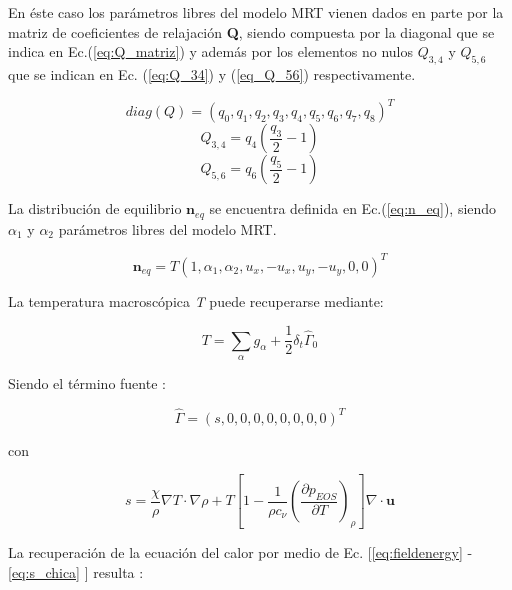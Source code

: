 En éste caso los parámetros libres del modelo MRT vienen dados en parte por la matriz de coeficientes de relajación \textbf{Q}, siendo compuesta por la diagonal que se indica en Ec.(\ref{eq:Q_matriz}) y además por los elementos no nulos $Q_{3,4}$ y $ Q_{5,6}$ que se indican en Ec. (\ref{eq:Q_34}) y (\ref{eq_Q_56})  respectivamente.

\begin{equation}
    \textit{diag} (Q) = {( q_{0} , q_{1} , q_{2} , q_{3} , q_{4} , q_{5} , q_{6} , q_{7} , q_{8} )}^{T}
    \label{eq:Q_matriz}
\end{equation}
\begin{equation}
    Q_{3,4} = q_{4} \left( \frac{q_{3}}{2} - 1 \right)
    \label{eq:Q_34}
\end{equation}
\begin{equation}
    Q_{5,6} = q_{6} \left( \frac{q_{5}}{2} - 1 \right)
    \label{eq_Q_56}
\end{equation}

La distribución de equilibrio $\mathbf{n}_{eq}$ se encuentra definida en Ec.(\ref{eq:n_eq}), siendo $\alpha_{1}$ y $\alpha_{2}$ parámetros libres del modelo MRT.

\begin{equation}
    {\mathbf{n}}_{eq} = T { \left( 1, \alpha_{1}, \alpha_{2}, u_{x}, -u_{x}, u_{y}, -u_{y}, 0, 0 \right) }^{T}
    \label{eq:n_eq}
\end{equation}

La temperatura macroscópica \textit{T} puede recuperarse mediante:

\begin{equation}
T = \sum_{\alpha} g_{\alpha} + \frac{1}{2} \delta_{t} {\hat{\Gamma}}_{0}
\end{equation}



Siendo el término fuente :


\begin{equation}
    \hat{\Gamma} = {( s, 0, 0, 0, 0, 0, 0, 0, 0 )}^{T}
\end{equation}

con 

\begin{equation}
    s = \frac{\chi}{\rho} \nabla T \cdot \nabla \rho + T \left[ 1 - \frac{1}{\rho c_{\nu}} {\left( \frac{\partial p_{EOS}}{\partial T} \right)}_{\rho} \right] \nabla \cdot \mathbf{u}
    \label{eq:s_chica}
\end{equation}

La recuperación de la ecuación del calor por medio de Ec. [\ref{eq:fieldenergy} - \ref{eq:s_chica} ] resulta \cite{markus2011simulation}:

